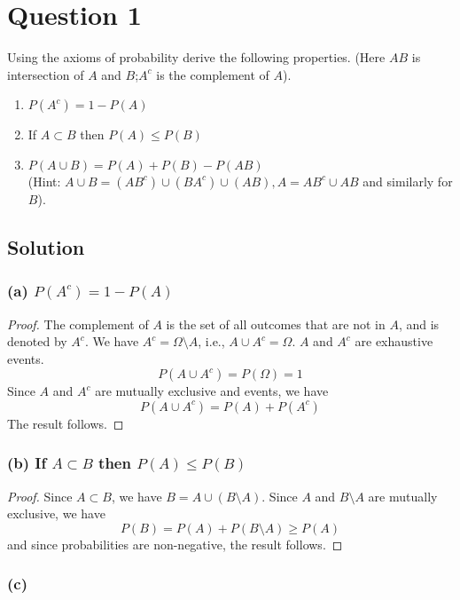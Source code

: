 \section*{Question 1}

Using the axioms of probability derive the following properties.
(Here \(AB\) is intersection of \(A\) and \(B\);\@ \(A^c\) is the complement of \(A\)).

\begin{enumerate}[label = (\alph*)]
    \item \( P(A^c)=1 - P(A) \)
    \item If \( A \subset B \) then \( P(A) \leq P(B) \)
    \item \( P(A\cup B)=P(A)+P(B)-P(AB) \) \\
          (Hint: \( A\cup B = (AB^c)\cup(BA^c)\cup(AB), A = AB^c \cup AB \) and similarly for \( B \)).
\end{enumerate}

\subsection*{Solution}

\subsubsection*{(a) \( P(A^c)=1 - P(A) \)}

\begin{proof}
    The complement of \(A\) is the set of all outcomes that are not in \(A\), and is denoted by \(A^c\).
    We have \(A^c = \Omega \setminus A\), i.e., \(A \cup A^c = \Omega \).
    \(A\) and \(A^c\) are exhaustive events.
    \begin{equation}
        P \left( A \cup A^c \right) = P \left( \Omega \right) = 1
    \end{equation}
    Since \(A\) and \(A^c\) are mutually exclusive and events, we have
    \begin{equation}
        P \left( A \cup A^c \right) = P(A) + P(A^c)
    \end{equation}
    The result follows.
\end{proof}

\subsubsection*{(b) If \( A \subset B \) then \( P(A) \leq P(B) \)}

\begin{proof}
    Since \(A \subset B\), we have \(B = A \cup (B \setminus A)\).
    Since \(A\) and \(B \setminus A\) are mutually exclusive, we have
    \begin{equation}
        P(B) = P(A) + P(B \setminus A) \geq P(A)
    \end{equation}
    and since probabilities are non-negative, the result follows.
\end{proof}

\subsubsection*{(c)}
